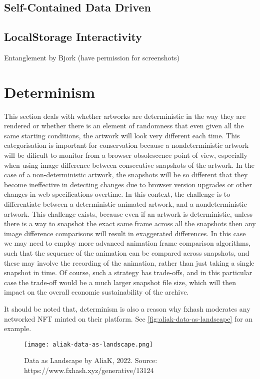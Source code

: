 \subsection{Self-Contained Data Driven}

\subsection{LocalStorage Interactivity}

Entanglement by Bjork (have permission for screenshots)

\section{Determinism}

This section deals with whether artworks are deterministic in the way they are rendered or whether there is an element of randomness that even given all the same starting conditions, the artwork will look very different each time. This categorisation is important for conservation because a nondeterministic artwork will be dificult to monitor from a browser obsolescence point of view, especially when using image difference between consecutive snapshots of the artwork. In the case of a non-deterministic artwork, the snapshots will be so different that they become ineffective in detecting changes due to browser version upgrades or other changes in web specifications overtime. In this context, the challenge is to differentiate between a deterministic animated artwork, and a nondeterministic artwork. This challenge exists, because even if an artwork is deterministic, unless there is a way to snapshot the exact same frame across all the snapshots then any image difference comparisons will result in exaggerated differences. In this case we may need to employ more advanced animation frame comparison algorithms, such that the sequence of the animation can be compared across snapshots, and these may involve the recording of the animation, rather than just taking a single snapshot in time. Of course, such a strategy has trade-offs, and in this particular case the trade-off would be a much larger snapshot file size, which will then impact on the overall economic sustainability of the archive.

It should be noted that, determinism is also a reason why fxhash moderates any networked NFT minted on their platform. See \autoref{fig:aliak-data-as-landscape} for an example.

\begin{figure}[h]
    \centering
    \texttt{[image: aliak-data-as-landscape.png]}
    \caption[Data as Landscape by AliaK]{Data as Landscape by AliaK, 2022. Source: https://www.fxhash.xyz/generative/13124}
    \label{fig:aliak-data-as-landscape}
\end{figure}



